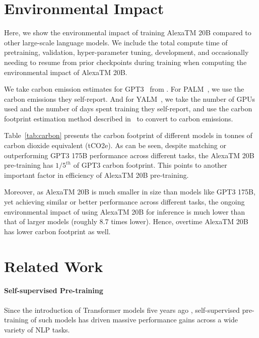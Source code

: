 \section{Environmental Impact}
\label{sec:environmental-impact}

Here, we show the environmental impact of training {AlexaTM 20B}  compared to other large-scale language models. We include the total compute time of pretraining, validation, hyper-parameter tuning, development, and occasionally needing to resume from prior checkpoints during training when computing the environmental impact of {AlexaTM 20B}.

We take carbon emission estimates for GPT3~\citep{Brown2020LanguageMA} from \cite{CarbonEmissions}. For PALM~\citep{Chowdhery2022PaLMSL}, we use the carbon emissions they self-report. And for YALM~\citep{YALM100B}, we take the number of GPUs used and the number of days spent training they self-report, and use the carbon footprint estimation method described in~\citep{CarbonEstinationMethod} to convert to carbon emissions.

Table~\ref{tab:carbon} presents the carbon footprint of different models in tonnes of carbon dioxide equivalent (tCO2e). As can be seen, despite matching or outperforming GPT3 175B performance across different tasks, the {AlexaTM 20B} pre-training has $1/5^{th}$ of GPT3 carbon footprint. This points to another important factor in efficiency of {AlexaTM 20B} pre-training.

Moreover, as {AlexaTM 20B} is much smaller in size than models like GPT3 175B, yet achieving similar or better performance across different tasks, the ongoing environmental impact of using {AlexaTM 20B} for inference is much lower than that of larger models (roughly 8.7 times lower). Hence, overtime {AlexaTM 20B} has lower carbon footprint as well. 

\section{Related Work}
\label{sec:related-work}

\paragraph{Self-supervised Pre-training}

Since the introduction of Transformer models five years ago \citep{Vaswani2017AttentionIA}, self-supervised pre-training of such models has driven massive performance gains across a wide variety of NLP tasks.  

